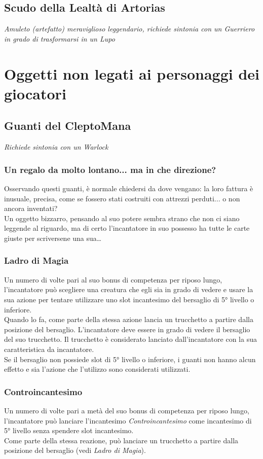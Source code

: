 \subsection{Scudo della Lealtà di Artorias}
\textit{Amuleto (artefatto) meraviglioso leggendario, richiede sintonia con un Guerriero in grado di trasformarsi in un Lupo}

\section{Oggetti non legati ai personaggi dei giocatori}

\subsection{Guanti del CleptoMana}
\textit{Richiede sintonia con un Warlock} 

\subsubsection{Un regalo da molto lontano... ma in che direzione?}
Osservando questi guanti, è normale chiedersi da dove vengano: la loro fattura è inusuale, precisa, come se fossero stati costruiti con attrezzi perduti... o non ancora inventati? \\
Un oggetto bizzarro, pensando al suo potere sembra strano che non ci siano leggende al riguardo, ma di certo l'incantatore in suo possesso ha tutte le carte giuste per scriversene una sua…

\subsubsection{Ladro di Magia}
Un numero di volte pari al suo bonus di competenza per riposo lungo, l'incantatore può scegliere una creatura che egli sia in grado di vedere e usare la sua azione per tentare utilizzare uno slot incantesimo del bersaglio di 5° livello o inferiore. \\
Quando lo fa, come parte della stessa azione lancia un trucchetto a partire dalla posizione del bersaglio. L'incantatore deve essere in grado di vedere il bersaglio del suo trucchetto. Il trucchetto è considerato lanciato dall'incantatore con la sua caratteristica da incantatore. \\ Se il bersaglio non possiede slot di 5° livello o inferiore, i guanti non hanno alcun effetto e sia l'azione che l'utilizzo sono considerati utilizzati.

\subsubsection{Controincantesimo}
Un numero di volte pari a metà del suo bonus di competenza per riposo lungo, l'incantatore può lanciare l'incantesimo \textit{Controincantesimo} come incantesimo di 5° livello senza spendere slot incantesimo. \\ Come parte della stessa reazione, può lanciare un trucchetto a partire dalla posizione del bersaglio (vedi \textit{Ladro di Magia}).

